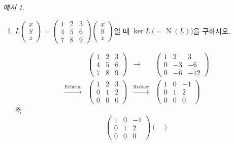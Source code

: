 \documentclass[unfonts,oneside,a4paper]{oblivoir}
\theoremstyle{definition}
\theoremstyle{theorem}
\theoremstyle{remark}
\theoremstyle{remark}
\theoremstyle{remark}
\newtheorem*{example}{예시}
\theoremstyle{remark}
\DeclareMathOperator{\Null}{N}
\begin{document}
\begin{example}
    \leavevmode
    \begin{enumerate}
        \item $L \begin{pmatrix}x \\ y \\ z\end{pmatrix} = \begin{pmatrix}1 & 2 & 3 \\ 4 & 5 & 6 \\ 7 & 8 & 9\end{pmatrix} \begin{pmatrix}x \\ y \\ z\end{pmatrix}$일 때 $\ker L\ \bigl(= \Null (L)\bigr)$을 구하시오.
            \begin{solution}
                \begin{align*}
                    &\begin{pmatrix}
                    1 & 2 & 3 \\ 4 & 5 & 6 \\ 7 & 8 & 9
                    \end{pmatrix}&\rightarrow &\begin{pmatrix}
                    1 & 2 & 3 \\ 0 & -3 & -6 \\ 0 & -6 & -12
                \end{pmatrix}\\
                \xrightarrow{\text{Echelon}} &\begin{pmatrix}
                    1 & 2 & 3 \\ 0 & 1 & 2 \\ 0 & 0 & 0
                    \end{pmatrix}&\xrightarrow{\text{Reduce}} &\begin{pmatrix}
                    1 & 0 & -1 \\ 0 & 1 & 2 \\ 0 & 0 & 0
                \end{pmatrix}
            \end{align*}
            즉
            \begin{equation*}
                \begin{pmatrix}
                    1 & 0 & -1 \\ 0 & 1 & 2 \\ 0 & 0 & 0
                    \end{pmatrix} \begin{pmatrix}

\end{pmatrix}
\end{equation*}
\end{solution}
\end{enumerate}
\end{example}
\end{document}

